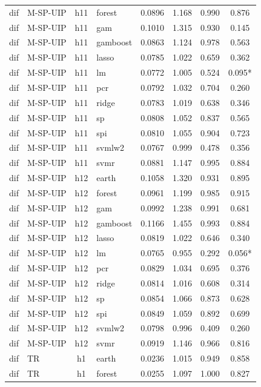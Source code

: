 \begin{ThreePartTable}
\begin{longtable}[t]{llclcccc}
dif & M-SP-UIP & h11 & forest & 0.0896 & 1.168 & 0.990 & 0.876\\
dif & M-SP-UIP & h11 & gam & 0.1010 & 1.315 & 0.930 & 0.145\\
dif & M-SP-UIP & h11 & gamboost & 0.0863 & 1.124 & 0.978 & 0.563\\
dif & M-SP-UIP & h11 & lasso & 0.0785 & 1.022 & 0.659 & 0.362\\
dif & M-SP-UIP & h11 & lm & 0.0772 & 1.005 & 0.524 & 0.095*\\
dif & M-SP-UIP & h11 & pcr & 0.0792 & 1.032 & 0.704 & 0.260\\
dif & M-SP-UIP & h11 & ridge & 0.0783 & 1.019 & 0.638 & 0.346\\
dif & M-SP-UIP & h11 & sp & 0.0808 & 1.052 & 0.837 & 0.565\\
dif & M-SP-UIP & h11 & spi & 0.0810 & 1.055 & 0.904 & 0.723\\
dif & M-SP-UIP & h11 & svmlw2 & 0.0767 & 0.999 & 0.478 & 0.356\\
dif & M-SP-UIP & h11 & svmr & 0.0881 & 1.147 & 0.995 & 0.884\\
\addlinespace
dif & M-SP-UIP & h12 & earth & 0.1058 & 1.320 & 0.931 & 0.895\\
dif & M-SP-UIP & h12 & forest & 0.0961 & 1.199 & 0.985 & 0.915\\
dif & M-SP-UIP & h12 & gam & 0.0992 & 1.238 & 0.991 & 0.681\\
dif & M-SP-UIP & h12 & gamboost & 0.1166 & 1.455 & 0.993 & 0.884\\
dif & M-SP-UIP & h12 & lasso & 0.0819 & 1.022 & 0.646 & 0.340\\
dif & M-SP-UIP & h12 & lm & 0.0765 & 0.955 & 0.292 & 0.056*\\
dif & M-SP-UIP & h12 & pcr & 0.0829 & 1.034 & 0.695 & 0.376\\
dif & M-SP-UIP & h12 & ridge & 0.0814 & 1.016 & 0.608 & 0.314\\
dif & M-SP-UIP & h12 & sp & 0.0854 & 1.066 & 0.873 & 0.628\\
dif & M-SP-UIP & h12 & spi & 0.0849 & 1.059 & 0.892 & 0.699\\
dif & M-SP-UIP & h12 & svmlw2 & 0.0798 & 0.996 & 0.409 & 0.260\\
dif & M-SP-UIP & h12 & svmr & 0.0919 & 1.146 & 0.966 & 0.816\\
\addlinespace
dif & TR & h1 & earth & 0.0236 & 1.015 & 0.949 & 0.858\\
dif & TR & h1 & forest & 0.0255 & 1.097 & 1.000 & 0.827\\

\end{longtable}
\end{ThreePartTable}

